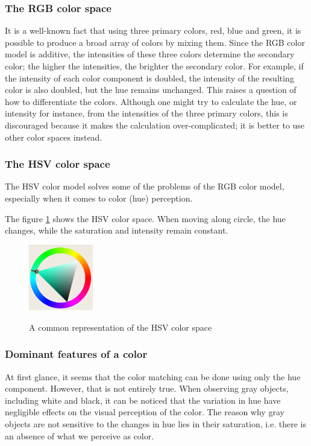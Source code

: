 \documentclass[times, utf8, zavrsni]{fer}
\begin{document}
\subsubsection{The RGB color space}
It is a well-known fact that using three primary colors, red, blue and green, it
is possible to produce a broad array of colors by mixing them. Since the RGB
color model is additive, the intensities of these three colors determine the
secondary color; the higher the intensities, the brighter the secondary color.
For example, if the intensity of each color component is doubled, the intensity
of the resulting color is also doubled, but the hue remains unchanged. This
raises a question of how to differentiate the colors. Although one might try to
calculate the hue, or intensity for instance, from the intensities of the three
primary colors, this is discouraged because it makes the calculation
over-complicated; it is better to use other color spaces instead.

\subsubsection{The HSV color space}

The HSV color model solves some of the problems of the RGB color model,
especially when it comes to color (hue) perception. 

The figure \ref{fig:hsv-representation} shows the HSV color space. When moving
along circle, the hue changes, while the saturation and intensity remain
constant.

\begin{figure}[htb]
\caption{A common representation of the HSV color space}
\centering
\includegraphics[width=0.25\textwidth]{images/hsv-representation}
\label{fig:hsv-representation}
\end{figure}


\subsubsection{Dominant features of a color}
At first glance, it seems that the color matching can be done using only the hue
component. However, that is not entirely true. When observing gray objects,
including white and black, it can be noticed that the variation in hue have
negligible effects on the visual perception of the color. The reason why gray
objects are not sensitive to the changes in hue lies in their saturation, i.e.
there is an absence of what we perceive as color.
\end{document}
